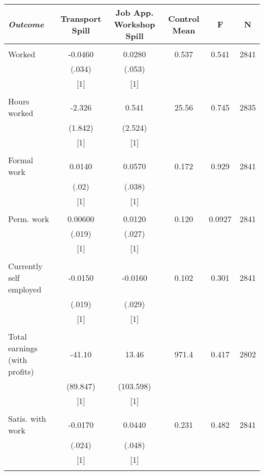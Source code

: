 \begin{tabular}{lccccc} \hline
\multicolumn{1}{l}{\emph{Outcome}} & \multicolumn{1}{c}{Transport Spill} &\multicolumn{1}{c}{Job App. Workshop Spill} & \multicolumn{1}{c}{Control Mean} & \multicolumn{1}{c}{F} & \multicolumn{1}{c}{N} \\ \hline \\
Worked & -0.0460 & 0.0280 & 0.537 & 0.541 & 2841 \\
& (.034) & (.053) &  &  &  \\
& [1] & [1] &  &  &  \\
&  &  &  &  &  \\
Hours worked & -2.326 & 0.541 & 25.56 & 0.745 & 2835 \\
& (1.842) & (2.524) &  &  &  \\
& [1] & [1] &  &  &  \\
&  &  &  &  &  \\
Formal work & 0.0140 & 0.0570 & 0.172 & 0.929 & 2841 \\
& (.02) & (.038) &  &  &  \\
& [1] & [1] &  &  &  \\
&  &  &  &  &  \\
Perm. work & 0.00600 & 0.0120 & 0.120 & 0.0927 & 2841 \\
& (.019) & (.027) &  &  &  \\
& [1] & [1] &  &  &  \\
&  &  &  &  &  \\
Currently self employed & -0.0150 & -0.0160 & 0.102 & 0.301 & 2841 \\
& (.019) & (.029) &  &  &  \\
& [1] & [1] &  &  &  \\
&  &  &  &  &  \\
Total earnings (with profits) & -41.10 & 13.46 & 971.4 & 0.417 & 2802 \\
& (89.847) & (103.598) &  &  &  \\
& [1] & [1] &  &  &  \\
&  &  &  &  &  \\
Satis. with work & -0.0170 & 0.0440 & 0.231 & 0.482 & 2841 \\
& (.024) & (.048) &  &  &  \\
& [1] & [1] &  &  &  \\
&  &  &  &  &  \\ \hline
\end{tabular}
